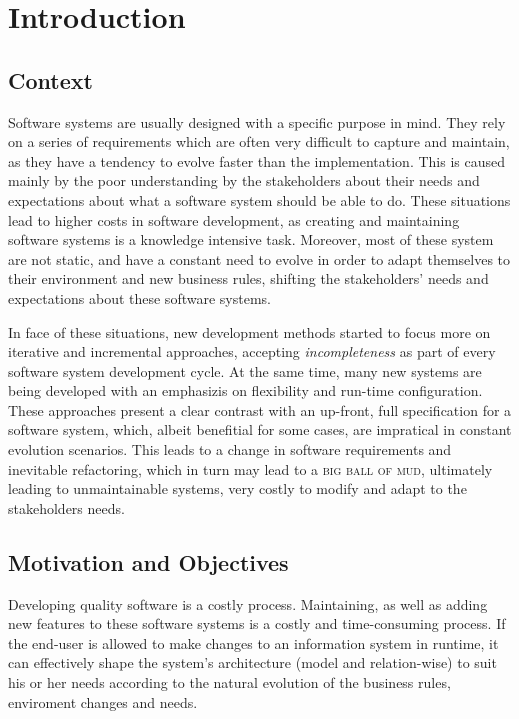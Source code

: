 \chapter{Introduction}\label{chap:intro}

\section{Context}\label{sec:context}

Software systems are usually designed with a specific purpose in mind\cite{}. They rely on a series of requirements which are often very difficult to capture and maintain, as they have a tendency to evolve faster than the implementation. This is caused mainly by the poor understanding by the stakeholders about their needs and expectations about what a software system should be able to do\cite{PT07}. These situations lead to higher costs in software development, as creating and maintaining software systems is a knowledge intensive task\cite{AdOdSBD07}. Moreover, most of these system are not static, and have a constant need to evolve in order to adapt themselves to their environment and new business rules, shifting the stakeholders' needs and expectations about these software systems.

In face of these situations, new development methods started to focus more on iterative and incremental approaches, accepting \textit{incompleteness} as part of every software system development cycle\cite{WC03}. At the same time, many new systems are being developed with an emphasizis on flexibility and run-time configuration\cite{YJ02}. These approaches present a clear contrast with an up-front, full specification for a software system, which, albeit benefitial for some cases, are impratical in constant evolution scenarios. This leads to a change in software requirements and inevitable refactoring, which in turn may lead to a \textsc{big ball of mud}, ultimately leading to unmaintainable systems, very costly to modify and adapt to the stakeholders needs\cite{FY97}.

\section{Motivation and Objectives}\label{sec:goals}

Developing quality software is a costly process. Maintaining, as well as adding new features to these software systems is a costly and time-consuming process. If the end-user is allowed to make changes to an information system in runtime, it can effectively shape the system's architecture (model and relation-wise) to suit his or her needs according to the natural evolution of the business rules, enviroment changes and needs.

